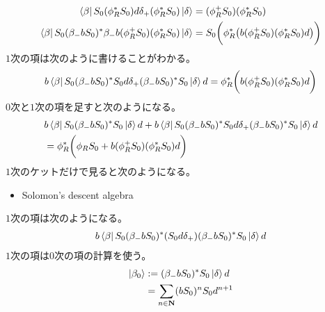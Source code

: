 {\begin{equation*}
\begin{split}
		\mathinner{\langle{\beta}|}S_0(\phi_R^*S_0)d\delta_+(\phi_R^*S_0)\mathinner{|{\delta}\rangle}
		&= (\phi_R^+S_0)(\phi_R^*S_0) \\
		\mathinner{\langle{\beta}|}S_0(\beta_-bS_0)^*\beta_-b(\phi_R^+S_0)(\phi_R^*S_0)
			\mathinner{|{\delta}\rangle}
		&= S_0\biggl(\phi_R^*\bigl(b(\phi_R^+S_0)(\phi_R^*S_0)d\bigr)\biggr) \\
	\end{split}\end{equation*}
	$1$次の項は次のように書けることがわかる。
	\begin{equation*}\begin{split}
		b\mathinner{\langle{\beta}|}S_0(\beta_-bS_0)^*S_0d\delta_+(\beta_-bS_0)^*S_0
			\mathinner{|{\delta}\rangle}d 
		= \phi_R^*\biggl(b(\phi_R^+S_0)(\phi_R^*S_0)d\biggr)
	\end{split}\end{equation*}
	$0$次と$1$次の項を足すと次のようになる。
	\begin{equation*}\begin{split}
		& b\mathinner{\langle{\beta}|}S_0(\beta_-bS_0)^*S_0\mathinner{|{\delta}\rangle}d 
		+ b\mathinner{\langle{\beta}|}S_0(\beta_-bS_0)^*S_0d\delta_+(\beta_-bS_0)^*S_0
			\mathinner{|{\delta}\rangle}d \\
		&= \phi_R^*\biggl(\phi_RS_0 + b(\phi_R^+S_0)(\phi_R^*S_0)d\biggr)
	\end{split}\end{equation*}
	$1$次のケットだけで見ると次のようになる。

	\begin{todo}[ここまで]\label{todo:ここまで} %
		\begin{itemize}\setlength{\itemsep}{-1mm} %
			\item Solomon's descent algebra
		\end{itemize} %
	\end{todo} %

	$1$次の項は次のようになる。
	\begin{equation*}\begin{split}
		b\mathinner{\langle{\beta}|}S_0(\beta_-bS_0)^*(S_0d\delta_+)(\beta_-bS_0)^*S_0
			\mathinner{|{\delta}\rangle}d
	\end{split}\end{equation*}
	$1$次の項は$0$次の項の計算を使う。
	\begin{equation*}\begin{split}
		\mathinner{|{\beta_0}\rangle} &:= (\beta_-bS_0)^*S_0\mathinner{|{\delta}\rangle}d \\
		&= \sum_{n\in\mathbf{N}}(bS_0)^nS_0d^{n+1}
	\end{split}\end{equation*}

}
